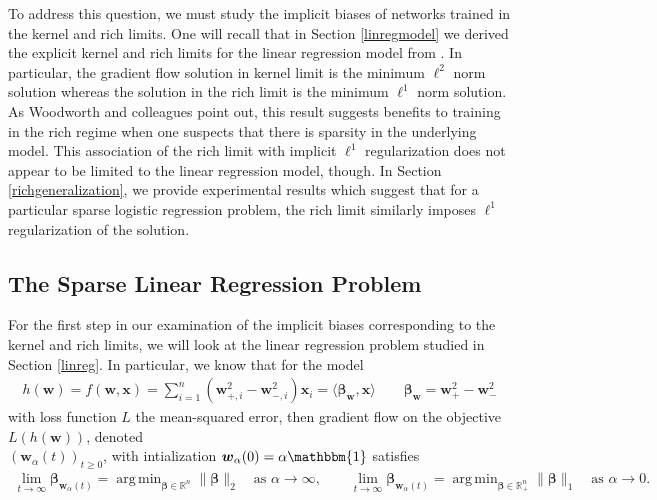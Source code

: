 \documentclass{article}
\DeclareMathOperator*{\argmin}{arg\,min}
\begin{document}
To address this question, we must study the implicit biases of networks trained in the kernel and rich limits. One will recall that in Section \ref{linregmodel} we derived the explicit kernel and rich limits for the linear regression model from \cite{woodworth2020kernel}. In particular, the gradient flow solution in kernel limit is the minimum $\ell^2$ norm solution whereas the solution in the rich limit is the minimum $\ell^1$ norm solution. As Woodworth and colleagues point out, this result suggests benefits to training in the rich regime when one suspects that there is sparsity in the underlying model. This association of the rich limit with implicit $\ell^1$ regularization does not appear to be limited to the linear regression model, though. In Section \ref{richgeneralization}, we provide experimental results which suggest that for a particular sparse logistic regression problem, the rich limit similarly imposes $\ell^1$ regularization of the solution.

\subsection{The Sparse Linear Regression Problem}\label{sparselinear}

For the first step in our examination of the implicit biases corresponding to the kernel and rich limits, we will look at the linear regression problem studied in Section \ref{linreg}. In particular, we know that for the model
\begin{align*}
    h(\boldsymbol{w}) = f(\boldsymbol{w}, \boldsymbol{x}) = \sum_{i=1}^n(\boldsymbol{w}_{+, i}^2 - \boldsymbol{w}_{-, i}^2)\boldsymbol{x}_i = \langle \boldsymbol{\beta}_{\boldsymbol{w}}, \boldsymbol{x} \rangle \qquad \boldsymbol{\beta}_{\boldsymbol{w}} = \boldsymbol{w}_+^2 -\boldsymbol{w}_-^2
\end{align*}
with loss function $L$ the mean-squared error, then gradient flow on the objective $L(h(\boldsymbol{w}))$, denoted\\ $(\boldsymbol{w}_{\alpha}(t))_{t \geq 0}$, with intialization $\boldsymbol{w}_{\alpha}(0) = \alpha \mathbbm{1}$ satisfies
\begin{align*}
    \lim_{t \to \infty} \boldsymbol{\beta}_{\boldsymbol{w}_{\alpha}(t)} = \argmin_{\boldsymbol{\beta} \in \mathbb{R}^n}  \| \boldsymbol{\beta} \|_2 \quad \text{as $\alpha \longrightarrow \infty$}, \qquad 
    \lim_{t \to \infty} \boldsymbol{\beta}_{\boldsymbol{w}_{\alpha}(t)} = \argmin_{\boldsymbol{\beta} \in \mathbb{R}_+^n}  \| \boldsymbol{\beta} \|_1 \quad \text{as $\alpha \longrightarrow 0$}.
\end{align*}
\end{document}

